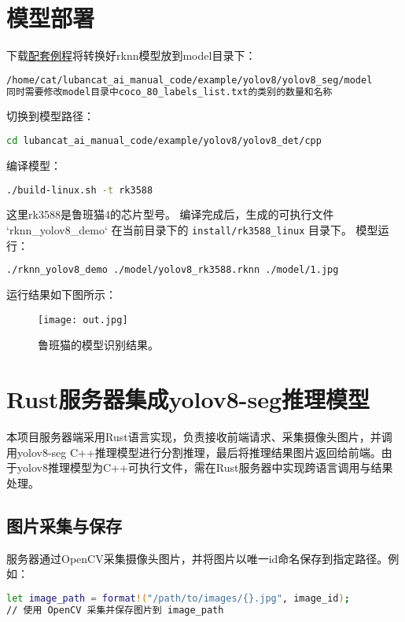 \section{模型部署}
\noindent 下载\href{https://gitee.com/LubanCat/lubancat_ai_manual_code.git}{配套例程}将转换好rknn模型放到model目录下：
\begin{lstlisting}[language=bash, basicstyle=\ttfamily\small, keywordstyle=\color{blue}]
/home/cat/lubancat_ai_manual_code/example/yolov8/yolov8_seg/model
同时需要修改model目录中coco_80_labels_list.txt的类别的数量和名称
\end{lstlisting}
切换到模型路径：
\begin{lstlisting}[language=bash, basicstyle=\ttfamily\small, keywordstyle=\color{blue}]
cd lubancat_ai_manual_code/example/yolov8/yolov8_det/cpp
\end{lstlisting}
编译模型：
\begin{lstlisting}[language=bash, basicstyle=\ttfamily\small, keywordstyle=\color{blue}]
 ./build-linux.sh -t rk3588
\end{lstlisting}
这里rk3588是鲁班猫4的芯片型号。
编译完成后，生成的可执行文件 `rknn\_yolov8\_demo` 在当前目录下的 \texttt{install/rk3588\_linux} 目录下。
模型运行：
\begin{lstlisting}[language=bash, basicstyle=\ttfamily\small, keywordstyle=\color{blue}]
./rknn_yolov8_demo ./model/yolov8_rk3588.rknn ./model/1.jpg
\end{lstlisting}
运行结果如下图所示：
\begin{figure}[h!]  %
    \centering  %
    \texttt{[image: out.jpg]}  %
    \caption{鲁班猫的模型识别结果。}  %
\end{figure}

\section{Rust服务器集成yolov8-seg推理模型}
本项目服务器端采用Rust语言实现，负责接收前端请求、采集摄像头图片，并调用yolov8-seg C++推理模型进行分割推理，最后将推理结果图片返回给前端。由于yolov8推理模型为C++可执行文件，需在Rust服务器中实现跨语言调用与结果处理。
\subsection{图片采集与保存}
服务器通过OpenCV采集摄像头图片，并将图片以唯一id命名保存到指定路径。例如：
\begin{lstlisting}[language=bash, breaklines=true]
let image_path = format!("/path/to/images/{}.jpg", image_id);
// 使用 OpenCV 采集并保存图片到 image_path
\end{lstlisting}
